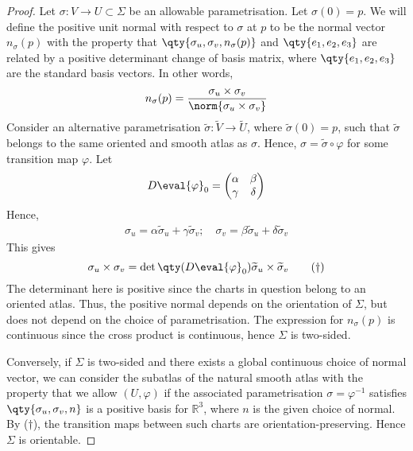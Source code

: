 \begin{proof}
	Let $\sigma \colon V \to U \subset \Sigma$ be an allowable parametrisation.
	Let $\sigma(0) = p$.
	We will define the positive unit normal with respect to $\sigma$ at $p$ to be the normal vector $n_\sigma(p)$ with the property that $\qty{\sigma_u, \sigma_v, n_\sigma(p)}$ and $\qty{e_1, e_2, e_3}$ are related by a positive determinant change of basis matrix, where $\qty{e_1, e_2, e_3}$ are the standard basis vectors.
	In other words,
	\begin{align*}
		n_\sigma(p) = \frac{\sigma_u \times \sigma_v}{\norm{\sigma_u \times \sigma_v}}
	\end{align*}
	Consider an alternative parametrisation $\widetilde \sigma \colon \widetilde V \to \widetilde U$, where $\widetilde \sigma(0) = p$, such that $\widetilde \sigma$ belongs to the same oriented and smooth atlas as $\sigma$.
	Hence, $\sigma = \widetilde \sigma \circ \varphi$ for some transition map $\varphi$.
	Let
	\begin{align*}
		D \eval{\varphi}_0 = \begin{pmatrix}
			\alpha & \beta  \\
			\gamma & \delta
		\end{pmatrix}
	\end{align*}
	Hence,
	\begin{align*}
		\sigma_u = \alpha \widetilde \sigma_u + \gamma \widetilde \sigma_v;\quad \sigma_v = \beta \widetilde \sigma_u + \delta \widetilde \sigma_v
	\end{align*}
	This gives
	\begin{equation}
		\sigma_u \times \sigma_v = \det\qty(D \eval{\varphi}_0) \widetilde \sigma_u \times \widetilde \sigma_v \tag{$\dagger$}
	\end{equation}
	The determinant here is positive since the charts in question belong to an oriented atlas.
	Thus, the positive normal depends on the orientation of $\Sigma$, but does not depend on the choice of parametrisation.
	The expression for $n_\sigma(p)$ is continuous since the cross product is continuous, hence $\Sigma$ is two-sided.

	Conversely, if $\Sigma$ is two-sided and there exists a global continuous choice of normal vector, we can consider the subatlas of the natural smooth atlas with the property that we allow $(U,\varphi)$ if the associated parametrisation $\sigma = \varphi^{-1}$ satisfies $\qty{\sigma_u, \sigma_v, n}$ is a positive basis for $\mathbb R^3$, where $n$ is the given choice of normal.
	By ($\dagger$), the transition maps between such charts are orientation-preserving.
	Hence $\Sigma$ is orientable.
\end{proof}
